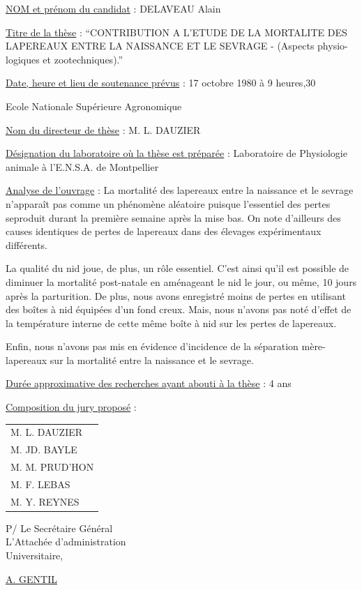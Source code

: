 \uline{NOM et prénom du candidat} : DELAVEAU Alain

\uline{Titre de la thèse} : ``CONTRIBUTION A L'ETUDE DE LA MORTALITE DES LAPEREAUX ENTRE LA NAISSANCE ET LE SEVRAGE - (Aspects physio-\newline
logiques et zootechniques).''

\uline{Date, heure et lieu de soutenance prévus} : 17 octobre 1980 à 9 heures,30

Ecole Nationale Supérieure Agronomique

\uline{Nom du directeur de thèse} : M. L. DAUZIER

\uline{Désignation du laboratoire où la thèse est préparée} : Laboratoire de Physiologie animale à l'E.N.S.A. de Montpellier

\uline{Analyse de l'ouvrage} : La mortalité des lapereaux entre la naissance et le sevrage n'apparaît pas comme un phénomène aléatoire puisque l'essentiel des pertes seproduit durant la première semaine après la mise bas. On note d'ailleurs des causes identiques de pertes de lapereaux dans des élevages expérimentaux différents.

La qualité du nid joue, de plus, un rôle essentiel. C'est ainsi qu'il est possible de diminuer la mortalité post-natale en aménageant le nid le jour, ou même, 10 jours après la parturition. De plus, nous avons enregistré moins de pertes en utilisant des boîtes à nid équipées d'un fond creux. Mais, nous n'avons pas noté d'effet de la température interne de cette même boîte à nid sur les pertes de lapereaux.

Enfin, nous n'avons pas mis en évidence d'incidence de la séparation mère-lapereaux sur la mortalité entre la naissance et le sevrage.

\uline{Durée approximative des recherches ayant abouti à la thèse} : 4 ans

\uline{Composition du jury proposé} :
\begin{tabular}{l}
M. L. DAUZIER\\
M. JD. BAYLE\\
M. M. PRUD'HON\\
M. F. LEBAS\\
M. Y. REYNES
\end{tabular}

\begin{flushright}
P/ Le Secrétaire Général\\
L'Attachée d'administration\\
Universitaire,


\uline{A. GENTIL}
\end{flushright}

